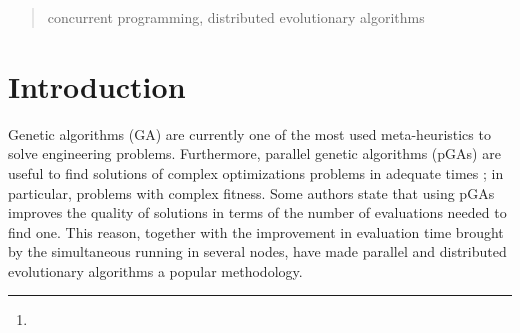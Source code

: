\documentclass[runningheads,a4paper]{llncs}
\newcommand{\keywords}[1]{\par\addvspace\baselineskip
\noindent\keywordname\enspace\ignorespaces#1}
\begin{document}
\mainmatter  %

\title{}


%
%
\author{Non A. Me%
\thanks{}}
%
\authorrunning{}


%
%


\maketitle


\begin{abstract}
\keywords{concurrent programming, distributed evolutionary algorithms}
\end{abstract}


\section{Introduction}

\noindent Genetic algorithms (GA) \cite{GA_Goldberg89} are currently
one of the most used meta-heuristics to solve engineering
problems. Furthermore, parallel genetic algorithms (pGAs) are useful
to find  solutions of complex optimizations problems in adequate times
\cite{Luque2011}; in particular, problems with complex fitness. Some
authors \cite{Alba2001} state that using pGAs improves the quality of
solutions in terms of the number of evaluations needed to find
one. This reason, together with the improvement in evaluation time
brought by the simultaneous running in several nodes, have made
parallel and distributed evolutionary algorithms a popular
methodology. 
\end{document}

